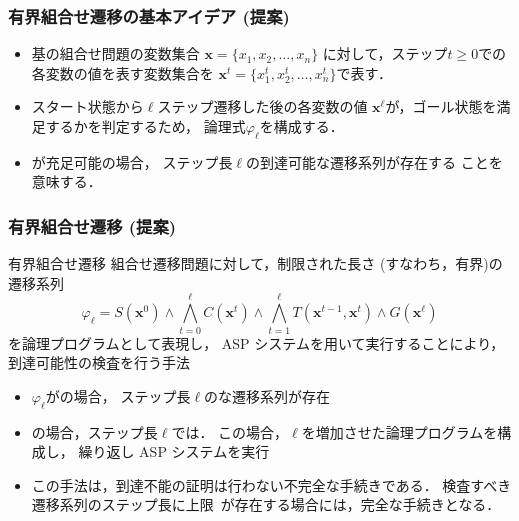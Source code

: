 \documentclass[dvipdfmx,11pt]{beamer}
\begin{document}
\begin{frame}
  \frametitle{有界組合せ遷移の基本アイデア (提案)}
  \begin{itemize}
  \item 基の組合せ問題の変数集合
    $\bm{x} = \{x_1,x_2,\ldots,x_n\}$
    に対して，ステップ$t\geq 0$での各変数の値を表す変数集合を
    $\bm{x}^{t} = \{x_1^t,x_2^t,\ldots,x_n^t\}$で表す．
  \item スタート状態から$\ell$ステップ遷移した後の各変数の値
    $\bm{x}^{\ell}$が，ゴール状態を満足するかを判定するため，
    論理式$\varphi_{\ell}$を構成する．
  \end{itemize}
  \begin{itemize}
  \item \bm{$\varphi_{\ell}$}が充足可能の場合，
    ステップ長$\ell$の到達可能な遷移系列が存在する
    ことを意味する．
  \end{itemize}
\end{frame}
\begin{frame}%
  \frametitle{有界組合せ遷移 (提案)} 
  \begin{alertblock}{有界組合せ遷移}\centering
    組合せ遷移問題に対して，制限された長さ (すなわち，有界)の
    遷移系列
    \[
    \varphi_{\ell} = S(\bm{x}^0)  
    \land \bigwedge_{t=0}^{\ell} C(\bm{x}^t) 
    \land \bigwedge_{t=1}^{\ell} T(\bm{x}^{t-1},\bm{x}^{t}) 
    \land G(\bm{x}^\ell)  
    \]
    を論理プログラムとして表現し，
    ASP システムを用いて実行することにより，到達可能性の検査を行う手法
  \end{alertblock}
  \begin{itemize}
  \item $\varphi_{\ell}$がの場合，
    ステップ長$\ell$のな遷移系列が存在
  \item {}の場合，ステップ長$\ell$では．
    この場合，$\ell$を増加させた論理プログラムを構成し，
    繰り返し ASP システムを実行
  \item この手法は，到達不能の証明は行わない不完全な手続きである．
    検査すべき遷移系列のステップ長に上限~\footnotemark[2]
    が存在する場合には，完全な手続きとなる．
  \end{itemize}
\end{frame}
\end{document}
